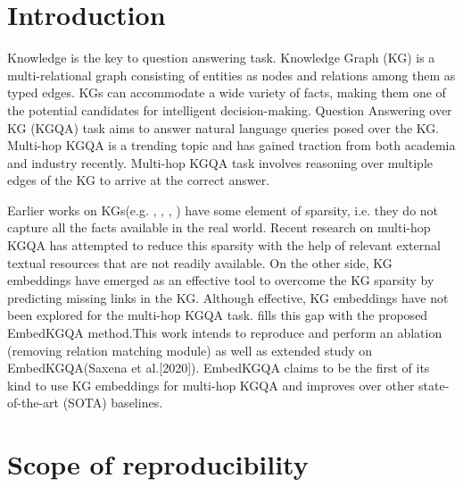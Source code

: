 
\section{Introduction}

Knowledge is the key to question answering task. Knowledge Graph (KG) is a multi-relational
graph consisting of entities as nodes and relations among them as typed edges. KGs can accommodate a wide variety of facts, making them one of the potential candidates for intelligent decision-making. Question Answering over KG (KGQA) task aims to answer natural language queries posed over the KG. Multi-hop KGQA is a trending topic and has gained traction from both academia and industry recently. Multi-hop KGQA task involves reasoning over multiple edges of the KG to arrive at the correct answer. 

Earlier works on KGs(e.g. \cite{yago}, \cite{freebase:datadumps}, \cite{dbpedia2015}, \cite{NELL}) have some element of sparsity, i.e. they do not capture all the facts available in the real world. Recent research on multi-hop KGQA has attempted to reduce this sparsity with the help of relevant external textual resources that are not readily available. On the other side, KG embeddings have emerged as an effective tool to overcome the KG sparsity by predicting missing links in the KG. Although effective, KG embeddings have not been explored for the multi-hop KGQA task. \cite{saxena-etal-2020-improving} fills this gap with the proposed EmbedKGQA method.This work intends to reproduce and perform an ablation (removing relation matching module) as well as extended study on EmbedKGQA(Saxena et al.[2020]). EmbedKGQA claims to be the first of its kind to use KG embeddings for multi-hop KGQA and improves over other state-of-the-art (SOTA) baselines.



\section{Scope of reproducibility}
\label{sec:claims}


